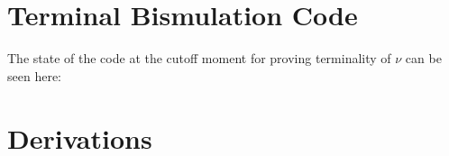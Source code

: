 \section{Terminal Bismulation Code}\label{app:bisim}
The state of the code at the cutoff moment for proving terminality of $\nu$ can be seen here:


\pagebreak
\section{Derivations}
